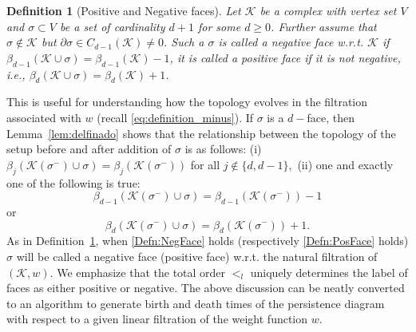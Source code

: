 \documentclass[12pt]{amsart}
\newcommand{\remove}[1]{}
\newtheorem{definition}[theorem]{Definition}
\newtheorem{remark}[theorem]{Remark}
\numberwithin{equation}{section}
\numberwithin{theorem}{section}
\newcommand{\1}{\mathbf{1}}
\def\K{\mathcal{K}}
\begin{document}
\remove{
\begin{remark}
\label{rem:dAndHighFacesUnaffectBettid-1}
Let $\K$ be a simplicial complex with vertex set $V.$ Let $\sigma \subset V$ be such that $|\sigma| = d + 1,$ $\sigma \notin \K$ but $\partial \sigma \in C_{d-1}(\K).$ Then a trivial consequence of Lemma \ref{lem:delfinado} is that $\beta_{d - 1}(\K) \geq \beta_{d - 1}(\K \cup \sigma),$ i.e., addition of a $d-$face cannot increase $\beta_{d-1}.$ Now let $\sigma \subset V$ be such that $|\sigma| = d^\prime + 1,$ where $d^\prime > d,$ $\sigma \notin \K$ but $\partial \sigma \in C_{d^\prime - 1}(\K).$ Then, from Lemma~\ref{lem:delfinado}, it also follows that $\beta_{d - 1}(\K) = \beta_{d - 1}(\K \cup \sigma ) ,$ i.e, addition of a face with dimension higher than $d$ cannot affect $\beta_{d - 1}.$
Given $(\K, w),$ where $w$ induces a filtration, we emphasize that the labelling of faces as either positive or negative is unique.
\end{remark}
}


\begin{definition}[Positive and Negative faces]
\label{def:positive}
Let $\K$ be a complex with vertex set $V$ and $\sigma \subset V$ be a set of cardinality $d+1$ for some $d \geq
0$. Further assume that $\sigma \notin \K$ but $\partial \sigma \in C_{d-1}(\K) \neq 0$. Such a $\sigma$ is called a {\em negative face} w.r.t. $\K$ if
$\beta_{d-1}(\K \cup \sigma) = \beta_{d-1}(\K)- 1$, it is called a {\em positive face}
if it is not negative, i.e., 	$\beta_d(\K \cup \sigma) = \beta_d(\K) + 1$.
\end{definition}
%

This is useful for understanding how the topology evolves in the filtration associated with $w$ (recall \eqref{eq:definition_minus}).  If $\sigma$ is a $d-$face, then Lemma~\ref{lem:delfinado} shows that the relationship between the topology of the setup before and after addition of $\sigma$ is as follows: (i) $\beta_j(\K(\sigma^-) \cup \sigma) = \beta_j(\K(\sigma^-))$ for all $j \notin \{d, d - 1\},$ (ii) one and exactly one of the following is true:
\begin{equation}
\label{Defn:NegFace}
\beta_{d - 1}(\K(\sigma^-) \cup \sigma) = \beta_{d - 1}(\K(\sigma^-))-1
\end{equation}
%
or
%
\begin{equation}
\label{Defn:PosFace}
\beta_d(\K(\sigma^-) \cup \sigma) = \beta_d(\K(\sigma^-)) + 1.
\end{equation}
%
As in Definition~\ref{def:positive}, when \eqref{Defn:NegFace} holds (respectively \eqref{Defn:PosFace} holds) $\sigma$ will be called a negative face (positive face) w.r.t. the natural filtration of $(\K,w)$. We emphasize that the total order $<_l$ uniquely determines the label of faces as either positive or negative.  The above discussion can be neatly converted to an algorithm to generate birth and death times of the persistence diagram with respect to a given linear filtration of the weight function $w$.
\end{document}
